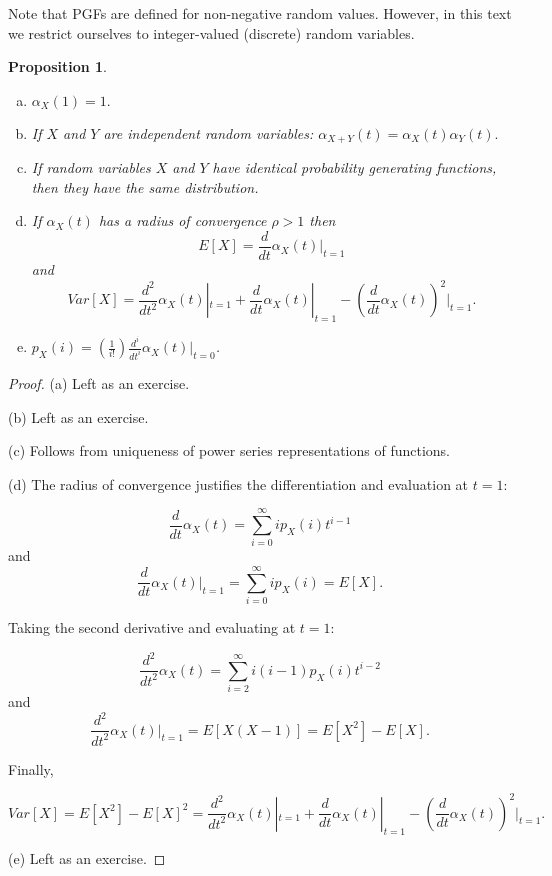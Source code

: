 \documentclass{book}
\theoremstyle{plain}%
\newtheorem{proposition}{Proposition}[section]
\theoremstyle{definition}
\begin{document}
Note that PGFs are defined for non-negative random values. However, in this text we restrict ourselves to integer-valued (discrete) random variables.

\begin{proposition}
\text{ } \newline
\begin{enumerate}[(a)]
\item $\alpha_X(1) = 1.$
\item If $X$ and $Y$ are independent random variables: $\alpha_{X+Y}(t) = \alpha_{X}(t)\alpha_{Y}(t).$
\item If random variables $X$ and $Y$ have identical probability generating functions, then they have the same distribution.
\item If $\alpha_X(t)$ has a radius of convergence $\rho > 1$ then $$E[X] = \frac{d}{dt}\alpha_X(t)|_{t=1}$$ and $$Var[X] = \frac{d^2}{dt^2}\alpha_X(t)|_{t=1} + \frac{d}{dt}\alpha_X(t)|_{t=1} - (\frac{d}{dt}\alpha_X(t))^2|_{t=1}.$$
\item $p_X(i) = \left(\frac{1}{i!}\right)\frac{d^i}{dt^i}\alpha_X(t)|_{t=0}$.\end{enumerate}\label{prop:pgf}
\end{proposition}

\begin{proof}
(a) Left as an exercise.

(b) Left as an exercise.

(c) Follows from uniqueness of power series representations of functions.

(d) The radius of convergence justifies the differentiation and evaluation at $t=1$:

$$\frac{d}{dt}\alpha_X(t) = \sum_{i=0}^\infty ip_X(i)t^{i-1}$$ and $$\frac{d}{dt}\alpha_X(t)|_{t=1}=\sum_{i=0}^\infty i p_X(i) = E[X].$$

Taking the second derivative and evaluating at $t=1$:

$$\frac{d^2}{dt^2}\alpha_X(t) = \sum_{i=2}^\infty i(i-1)p_X(i)t^{i-2}$$ and $$\frac{d^2}{dt^2}\alpha_X(t)|_{t=1} = E[X(X-1)] = E[X^2] - E[X].$$

Finally,

$$Var[X] = E[X^2] - E[X]^2 = \frac{d^2}{dt^2}\alpha_X(t)|_{t=1} + \frac{d}{dt}\alpha_X(t)|_{t=1} - (\frac{d}{dt}\alpha_X(t))^2|_{t=1}.$$

(e) Left as an exercise.
\end{proof}
\end{document}
